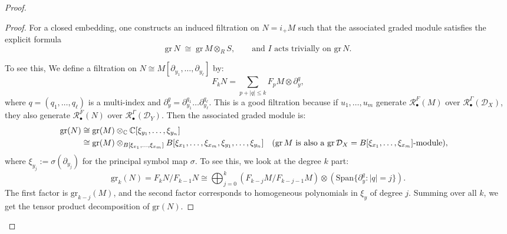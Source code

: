 \begin{proof}
\begin{proof}
        For a closed embedding, one constructs an induced filtration on $N=i_+M$ such that the associated graded
        module satisfies the explicit formula
        \[
            \mathrm{gr}\,N \;\cong\; \mathrm{gr}\,M \otimes_R S,
            \qquad\text{and } I \text{ acts trivially on }\mathrm{gr}\,N.
        \]

        To see this, We define a filtration on $N \cong M [\partial_{y_1}, \dots, \partial_{y_\ell}]$ by:
        \[
            F_k N = \sum_{p + |q| \le k} F_p M \otimes \partial_y^q,
        \]
        where $q = (q_1, \dots, q_\ell)$ is a multi-index and $\partial_y^q = \partial_{y_1}^{q_1} \dots \partial_{y_\ell}^{q_\ell}$.
        This is a good filtration because if $u_1, \dots, u_m$ generate $\mathcal{R}^{F}_{\bullet}(M)$ over $\mathcal{R}^{\Gamma}_{\bullet}(\mathcal{D}_X)$, they also generate $\mathcal{R}^{F}_{\bullet}(N)$ over $\mathcal{R}^{\Gamma}_{\bullet}(\mathcal{D}_Y)$.
        Then the associated graded module is:
        \begin{align*}
            \mathrm{gr}(N) & \cong \mathrm{gr}(M) \otimes_{\mathbb{C}} \mathbb{C}[\xi_{y_1}, \dots, \xi_{y_n}]                                                                                                                                      \\
                           & \cong \mathrm{gr}(M) \otimes_{B[\xi_{x_1}, \dots, \xi_{x_m}]} B[\xi_{x_1}, \dots, \xi_{x_m}, \xi_{y_1}, \dots, \xi_{y_n}] &  & \text{($\operatorname{gr} M$ is also a $\operatorname{gr} \mathcal{D}_X = B[\xi_{x_1}, \dots, \xi_{x_m}]$-module)},
        \end{align*}
        where $\xi_{y_j} := \sigma(\partial_{y_j})$ for the principal symbol map $\sigma$.
        To see this, we look at the degree $k$ part:
        \[
            \mathrm{gr}_k(N) = F_k N / F_{k-1} N \cong \bigoplus_{j=0}^k \left( F_{k-j} M / F_{k-j-1} M \right) \otimes \left( \text{Span}\{\partial_y^q : |q| = j\} \right).
        \]
        The first factor is $\mathrm{gr}_{k-j}(M)$, and the second factor corresponds to homogeneous polynomials in $\xi_y$ of degree $j$.
        Summing over all $k$, we get the tensor product decomposition of $\mathrm{gr}(N)$.


\end{proof}
\end{proof}
